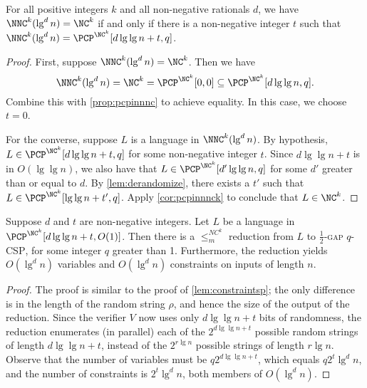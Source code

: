 \documentclass[]{article}
\begin{document}
\begin{lemma}\label{lem:1}
  For all positive integers $k$ and all non-negative rationals $d$, we have $\NNC^k(\lg^d n) = \NC^k$ if and only if there is a non-negative integer $t$ such that $\NNC^k(\lg^d n) = \PCP^{\NC^k}[d \lg \lg n + t, q]$.
\end{lemma}
\begin{proof}
  First, suppose $\NNC^k(\lg^d n) = \NC^k$.
  Then we have
  \begin{equation*}
    \NNC^k(\lg^d n)
    = \NC^k
    = \PCP^{\NC^k}[0, 0]
    \subseteq \PCP^{\NC^k}[d \lg \lg n, q].
  \end{equation*}
  Combine this with \autoref{prop:pcpinnnc} to achieve equality.
  In this case, we choose $t = 0$.

  For the converse, suppose $L$ is a language in $\NNC^k(\lg^d n)$.
  By hypothesis, $L \in \PCP^{\NC^k}[d \lg \lg n + t, q]$ for some non-negative integer $t$.
  Since $d \lg \lg n + t$ is in $O(\lg \lg n)$, we also have that $L \in \PCP^{\NC^k}[d' \lg \lg n, q]$ for some $d'$ greater than or equal to $d$.
  By \autoref{lem:derandomize}, there exists a $t'$ such that $L \in \PCP^{\NC^k}[\lg \lg n + t', q]$.
  Apply \autoref{cor:pcpinnnck} to conclude that $L \in \NC^k$.
\end{proof}

\begin{lemma}\label{lem:constraintsnc}
  Suppose $d$ and $t$ are non-negative integers.
  Let $L$ be a language in $\PCP^{\NC^k}[d \lg \lg n + t, O(1)]$.
  Then there is a $\leq_m^{NC^k}$ reduction from $L$ to \textsc{$\frac{1}{2}$-gap $q$-CSP}, for some integer $q$ greater than 1.
  Furthermore, the reduction yields $O(\lg^d n)$ variables and $O(\lg^d n)$ constraints on inputs of length $n$.
\end{lemma}
\begin{proof}
  The proof is similar to the proof of \autoref{lem:constraintsp}; the only difference is in the length of the random string $\rho$, and hence the size of the output of the reduction.
  Since the verifier $V$ now uses only $d \lg \lg n + t$ bits of randomness, the reduction enumerates (in parallel) each of the $2^{d \lg \lg n + t}$ possible random strings of length $d \lg \lg n + t$, instead of the $2^{r \lg n}$ possible strings of length $r \lg n$.
  Observe that the number of variables must be $q 2^{d \lg \lg n + t}$, which equals $q 2^t \lg^d n$, and the number of constraints is $2^t \lg^d n$, both members of $O(\lg^d n)$.
\end{proof}
\end{document}
